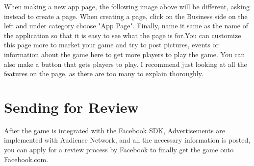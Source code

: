 \documentclass{article}
\begin{document}
When making a new app page, the following image above will be different, asking instead to create a page. When creating a page, click on the Business side on the left and under category choose "App Page". Finally, name it same as the name of the application so that it is easy to see what the page is for.You can customize this page more to market your game and try to post pictures, events or information about the game here to get more players to play the game. You can also make a button that gets players to play. I recommend just looking at all the features on the page, as there are too many to explain thoroughly.

\section{Sending for Review}
After the game is integrated with the Facebook SDK, Advertisements are implemented with Audience Network, and all the necessary information is posted, you can apply for a review process by Facebook to finally get the game onto Facebook.com. 
\end{document}
